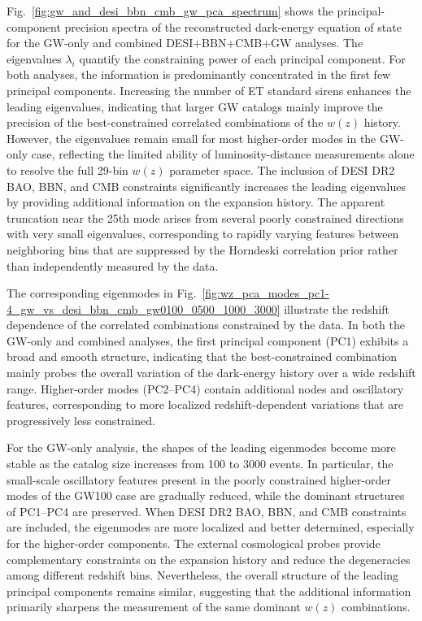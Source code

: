 \documentclass[
  aps,
  prd,
  twocolumn,
  nofootinbib,
  superscriptaddress,
  floatfix,
  longbibliography
]{revtex4-2}
\begin{document}
Fig.~\ref{fig:gw_and_desi_bbn_cmb_gw_pca_spectrum}
shows the principal-component precision spectra of the reconstructed
dark-energy equation of state for the GW-only and combined
DESI+BBN+CMB+GW analyses. The eigenvalues $\lambda_i$
quantify the constraining power of each principal component.
For both analyses, the information is predominantly concentrated in the
first few principal components. Increasing the number of ET standard
sirens enhances the leading eigenvalues, indicating that larger GW
catalogs mainly improve the precision of the best-constrained correlated
combinations of the $w(z)$ history. However, the eigenvalues remain small
for most higher-order modes in the GW-only case, reflecting the limited
ability of luminosity-distance measurements alone to resolve the full
29-bin $w(z)$ parameter space. The inclusion of DESI DR2 BAO, BBN, and CMB
constraints significantly increases the leading eigenvalues by providing
additional information on the expansion history. The apparent truncation
near the 25th mode arises from several poorly constrained directions with
very small eigenvalues, corresponding to rapidly varying features between
neighboring bins that are suppressed by the Horndeski correlation prior
rather than independently measured by the data.

The corresponding eigenmodes in
Fig.~\ref{fig:wz_pca_modes_pc1-4_gw_vs_desi_bbn_cmb_gw0100_0500_1000_3000}
illustrate the redshift dependence of the correlated combinations constrained
by the data. In both the GW-only and combined analyses, the first principal
component (PC1) exhibits a broad and smooth structure, indicating that the
best-constrained combination mainly probes the overall variation of the
dark-energy history over a wide redshift range. Higher-order modes
(PC2--PC4) contain additional nodes and oscillatory features, corresponding
to more localized redshift-dependent variations that are progressively
less constrained.

For the GW-only analysis, the shapes of the leading eigenmodes become more
stable as the catalog size increases from 100 to 3000 events. In particular,
the small-scale oscillatory features present in the poorly constrained
higher-order modes of the GW100 case are gradually reduced, while the
dominant structures of PC1--PC4 are preserved.
When DESI DR2 BAO, BBN, and CMB constraints are included, the eigenmodes are
more localized and better determined, especially for the higher-order
components. The external cosmological probes provide complementary
constraints on the expansion history and reduce the degeneracies among
different redshift bins. Nevertheless, the overall structure of the leading
principal components remains similar, suggesting that the additional
information primarily sharpens the measurement of the same dominant
$w(z)$ combinations.
\end{document}
